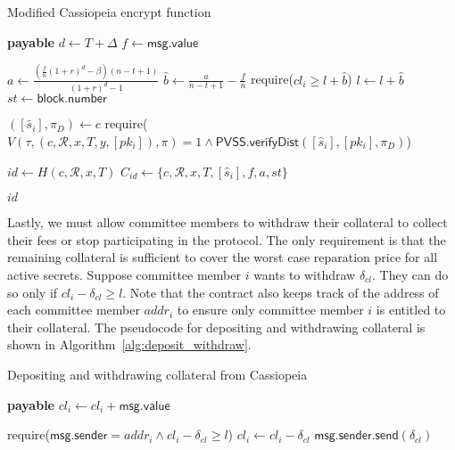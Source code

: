 \begin{algorithm}[h]
\caption{Modified Cassiopeia \textsf{encrypt} function}
\label{alg:encrypt_incentives}
    \begin{algorithmic}[1]
             \textbf{payable}
                \State $d \gets T + \Delta$
                \State $f \gets \textsf{msg.value}$

                \State $a \gets \frac{(\frac{f}{n}(1 + r)^d - \beta)(n - t + 1)}{(1 + r)^d - 1}$ 
                \State $\hat{b} \gets \frac{a}{n - t + 1} - \frac{f}{n}$ 
                    \State require($cl_i \geq l + \hat{b}$)
                \EndFor
                \State $l \gets l + \hat{b}$
                \State $st \gets \textsf{block.number}$

                \State $([\hat{s}_i], \pi_D) \gets c$
                \State require($V(\tau, (c, \mathcal{R}, x, T, y, [pk_i]), \pi) = 1 \land \textsf{PVSS.verifyDist}([\hat{s}_i], [pk_i], \pi_D)$)

                \State $id \gets H(c, \mathcal{R}, x, T)$
                \State $C_{id} \gets \{c, \mathcal{R}, x, T, [\hat{s}_i], f, a, st\}$

                \State \Return $id$
            \EndFunction
    \end{algorithmic}
\end{algorithm}

Lastly, we must allow committee members to withdraw their collateral to collect their fees or stop participating in the protocol.
The only requirement is that the remaining collateral is sufficient to cover the worst case reparation price for all active secrets.
Suppose committee member $i$ wants to withdraw $\delta_{cl}$.
They can do so only if $cl_i - \delta_{cl} \geq l$.
Note that the contract also keeps track of the address of each committee member $addr_i$ to ensure only committee member $i$ is entitled to their collateral.
The pseudocode for depositing and withdrawing collateral is shown in Algorithm~\ref{alg:deposit_withdraw}.

\begin{algorithm}[h]
\caption{Depositing and withdrawing collateral from Cassiopeia}
\label{alg:deposit_withdraw}
    \begin{algorithmic}[1]
         \textbf{payable}
            \State $cl_i \gets cl_i + \textsf{msg.value}$
        \EndFunction

            \State require($\textsf{msg.sender} = addr_i \land cl_i - \delta_{cl} \geq l$)
            \State $cl_i \gets cl_i - \delta_{cl}$
            \State $\textsf{msg.sender.send}(\delta_{cl})$
        \EndFunction
    \end{algorithmic}
\end{algorithm}
